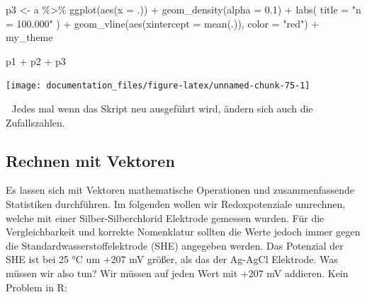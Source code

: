 \documentclass[
]{article}
\newenvironment{Shaded}{\begin{snugshade}}{\end{snugshade}}
\newcommand{\AttributeTok}[1]{\textcolor[rgb]{0.77,0.63,0.00}{#1}}
\newcommand{\FloatTok}[1]{\textcolor[rgb]{0.00,0.00,0.81}{#1}}
\newcommand{\FunctionTok}[1]{\textcolor[rgb]{0.00,0.00,0.00}{#1}}
\newcommand{\NormalTok}[1]{#1}
\newcommand{\OtherTok}[1]{\textcolor[rgb]{0.56,0.35,0.01}{#1}}
\newcommand{\SpecialCharTok}[1]{\textcolor[rgb]{0.00,0.00,0.00}{#1}}
\newcommand{\StringTok}[1]{\textcolor[rgb]{0.31,0.60,0.02}{#1}}
\begin{document}
\begin{Shaded}
\begin{Highlighting}[]
\NormalTok{p3 }\OtherTok{\textless{}{-}}\NormalTok{ a }\SpecialCharTok{\%\textgreater{}\%}
    \FunctionTok{ggplot}\NormalTok{(}\FunctionTok{aes}\NormalTok{(}\AttributeTok{x =}\NormalTok{ .)) }\SpecialCharTok{+}
    \FunctionTok{geom\_density}\NormalTok{(}\AttributeTok{alpha =} \FloatTok{0.1}\NormalTok{) }\SpecialCharTok{+}
    \FunctionTok{labs}\NormalTok{(}
        \AttributeTok{title =} \StringTok{"n = 100.000"}
\NormalTok{    ) }\SpecialCharTok{+}
    \FunctionTok{geom\_vline}\NormalTok{(}\FunctionTok{aes}\NormalTok{(}\AttributeTok{xintercept =} \FunctionTok{mean}\NormalTok{(.)), }\AttributeTok{color =} \StringTok{"red"}\NormalTok{) }\SpecialCharTok{+}
\NormalTok{    my\_theme}

\NormalTok{p1 }\SpecialCharTok{+}\NormalTok{ p2 }\SpecialCharTok{+}\NormalTok{ p3}
\end{Highlighting}
\end{Shaded}

\begin{center}\texttt{[image: documentation\_files/figure-latex/unnamed-chunk-75-1]} \end{center}

🚨 Jedes mal wenn das Skript neu ausgeführt wird, ändern sich auch die Zufallszahlen.

\hypertarget{rechnen-mit-vektoren}{%
\subsection{Rechnen mit Vektoren}\label{rechnen-mit-vektoren}}

Es lassen sich mit Vektoren mathematische Operationen und zusammenfassende Statistiken durchführen. Im folgenden wollen wir Redoxpotenziale umrechnen, welche mit einer Silber-Silberchlorid Elektrode gemessen wurden. Für die Vergleichbarkeit und korrekte Nomenklatur sollten die Werte jedoch immer gegen die Standardwasserstoffelektrode (SHE) angegeben werden. Das Potenzial der SHE ist bei 25 °C um +207 mV größer, als das der Ag-AgCl Elektrode. Was müssen wir also tun? Wir müssen auf jeden Wert mit +207 mV addieren. Kein Problem in R:
\end{document}
